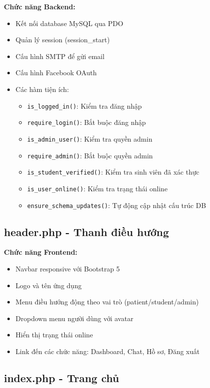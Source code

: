 \documentclass[a4paper,12pt]{article}
\begin{document}
\textbf{Chức năng Backend:}
\begin{itemize}
    \item Kết nối database MySQL qua PDO
    \item Quản lý session (session\_start)
    \item Cấu hình SMTP để gửi email
    \item Cấu hình Facebook OAuth
    \item Các hàm tiện ích:
    \begin{itemize}
        \item \texttt{is\_logged\_in()}: Kiểm tra đăng nhập
        \item \texttt{require\_login()}: Bắt buộc đăng nhập
        \item \texttt{is\_admin\_user()}: Kiểm tra quyền admin
        \item \texttt{require\_admin()}: Bắt buộc quyền admin
        \item \texttt{is\_student\_verified()}: Kiểm tra sinh viên đã xác thực
        \item \texttt{is\_user\_online()}: Kiểm tra trạng thái online
        \item \texttt{ensure\_schema\_updates()}: Tự động cập nhật cấu trúc DB
    \end{itemize}
\end{itemize}

\subsection{header.php - Thanh điều hướng}

\textbf{Chức năng Frontend:}
\begin{itemize}
    \item Navbar responsive với Bootstrap 5
    \item Logo và tên ứng dụng
    \item Menu điều hướng động theo vai trò (patient/student/admin)
    \item Dropdown menu người dùng với avatar
    \item Hiển thị trạng thái online
    \item Link đến các chức năng: Dashboard, Chat, Hồ sơ, Đăng xuất
\end{itemize}

\subsection{index.php - Trang chủ}
\end{document}
